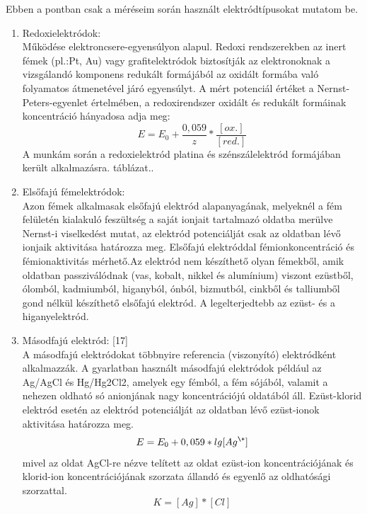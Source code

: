 Ebben a pontban csak a méréseim során használt elektródtípusokat mutatom be.
\begin{enumerate}
\item Redoxielektródok:\\
Működése elektroncsere-egyensúlyon alapul. Redoxi rendszerekben az inert fémek (pl.:Pt, Au) vagy grafitelektródok biztosítják az elektronoknak a vizsgálandó komponens redukált formájából az oxidált formába való folyamatos átmenetével járó egyensúlyt. A mért potenciál értéket a Nernst-Peters-egyenlet értelmében, a redoxirendszer oxidált és redukált formáinak koncentráció hányadosa adja meg:
\begin{equation}
E= E_\text{0} + \frac{0,059}{z} * \frac{[ox.]}{[red.]}
\end{equation}
A munkám során a redoxielektród platina és szénszálelektród formájában került alkalmazásra.
táblázat..
\item Elsőfajú fémelektródok:\\
Azon fémek alkalmasak elsőfajú elektród alapanyagának, melyeknél a  fém felületén kialakuló feszültség a saját ionjait tartalmazó oldatba merülve Nernst-i viselkedést mutat, az elektród potenciálját csak az oldatban lévő ionjaik aktivitása határozza meg. Elsőfajú elektróddal fémionkoncentráció és fémionaktivitás mérhető.Az elektród nem készíthető olyan fémekből, amik oldatban passziválódnak (vas, kobalt, nikkel és alumínium) viszont ezüstből, ólomból, kadmiumból, higanyból, ónból, bizmutból, cinkből és talliumből gond nélkül készíthető elsőfajú elektród. A legelterjedtebb az ezüst- és a higanyelektród.
\item Másodfajú elektród: [17]\\
A másodfajú elektródokat többnyire referencia (viszonyító) elektródként alkalmazzák. A gyarlatban használt másodfajú elektródok például az Ag/AgCl és Hg/Hg2Cl2, amelyek egy fémból, a fém sójából, valamit a nehezen oldható só anionjának nagy koncentrációjú oldatából áll. Ezüst-klorid elektród esetén az elektród potenciálját az oldatban lévő ezüst-ionok aktivitása határozza meg.\\
\begin{equation}
E = E_\text{0} + 0,059 * lg [Ag^\+]
\end{equation}
mivel az oldat AgCl-re nézve telített az oldat ezüst-ion koncentrációjának és klorid-ion koncentrációjának szorzata állandó és egyenlő az oldhatósági szorzattal.\\
\begin{equation}
K = [Ag] * [Cl]
\end{equation}

\end{enumerate}
